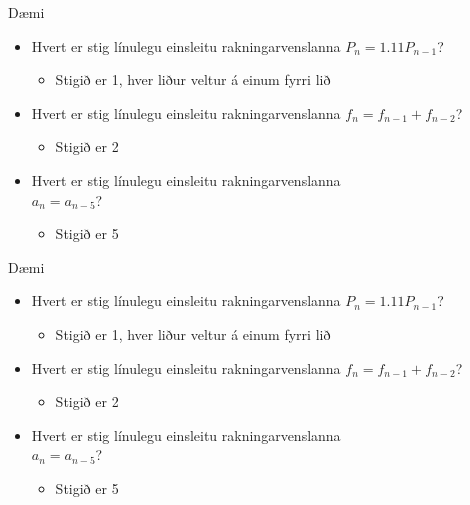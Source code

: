 \documentclass[handout]{beamer}
\begin{document}
\begin{frame}{Dæmi}
\begin{itemize}[<+->]
 \item Hvert er stig línulegu einsleitu rakningarvenslanna $P_n = 1.11P_{n-1}$?
 \begin{itemize}
  \item Stigið er 1, hver liður veltur á einum fyrri lið
 \end{itemize}
 \item Hvert er stig línulegu einsleitu rakningarvenslanna $f_n = f_{n-1} + f_{n-2}$?
 \begin{itemize}
  \item Stigið er 2
 \end{itemize}
 \item Hvert er stig línulegu einsleitu rakningarvenslanna\\ $a_n = a_{n-5}$?
 \begin{itemize}
  \item Stigið er 5
 \end{itemize}
\end{itemize}
\end{frame}

\begin{frame}{Dæmi}
\begin{itemize}[<+->]
 \item Hvert er stig línulegu einsleitu rakningarvenslanna $P_n = 1.11P_{n-1}$?
 \begin{itemize}
  \item Stigið er 1, hver liður veltur á einum fyrri lið
 \end{itemize}
 \item Hvert er stig línulegu einsleitu rakningarvenslanna $f_n = f_{n-1} + f_{n-2}$?
 \begin{itemize}
  \item Stigið er 2
 \end{itemize}
 \item Hvert er stig línulegu einsleitu rakningarvenslanna\\ $a_n = a_{n-5}$?
 \begin{itemize}
  \item Stigið er 5
 \end{itemize}
\end{itemize}
\end{frame}
\end{document}
